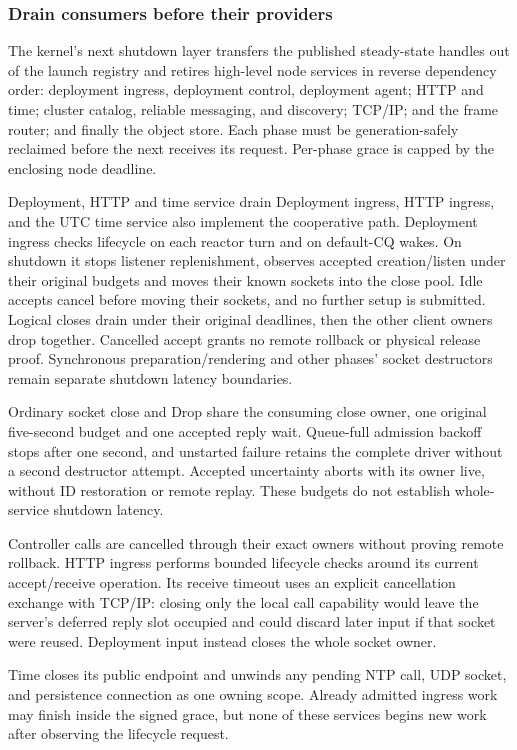 \subsubsection{Drain consumers before their providers}

The kernel's next shutdown layer transfers the published steady-state handles
out of the launch registry and retires high-level node services in reverse
dependency order: deployment ingress, deployment control, deployment agent;
HTTP and time; cluster catalog, reliable messaging, and discovery; TCP/IP; and
the frame router; and finally the object store. Each phase must be
generation-safely reclaimed before the next receives its request. Per-phase
grace is capped by the enclosing node deadline.

\begin{implementationdetail}{Deployment, HTTP and time service drain}
Deployment ingress, HTTP ingress, and the UTC time service also implement the
cooperative path. Deployment ingress checks lifecycle on each reactor turn and
on default-CQ wakes. On shutdown it stops listener replenishment, observes
accepted creation/listen under their original budgets and moves their known
sockets into the close pool. Idle accepts cancel before moving their sockets, and
no further setup is submitted. Logical closes drain under their original
deadlines, then the other client owners drop together. Cancelled accept grants
no remote rollback or physical release proof.
Synchronous preparation/rendering and other phases' socket destructors
remain separate shutdown latency boundaries.

Ordinary socket close and Drop
share the consuming close owner, one original five-second budget and one
accepted reply wait. Queue-full admission backoff stops after one second, and
unstarted failure retains the complete driver without a second destructor
attempt. Accepted uncertainty aborts with its owner live, without ID restoration
or remote replay. These budgets do not establish whole-service shutdown latency.

Controller calls are cancelled through their exact
owners without proving remote rollback. HTTP ingress performs bounded lifecycle checks around its current
accept/receive operation. Its receive timeout uses an explicit cancellation
exchange with TCP/IP: closing only the local call capability would leave the
server's deferred reply slot occupied and could discard later input if that
socket were reused. Deployment input instead closes the whole socket owner.

Time closes its public endpoint and
unwinds any pending NTP call, UDP socket, and persistence connection as one
owning scope. Already admitted ingress work may finish inside the signed grace,
but none of these services begins new work after observing the lifecycle
request.
\end{implementationdetail}

